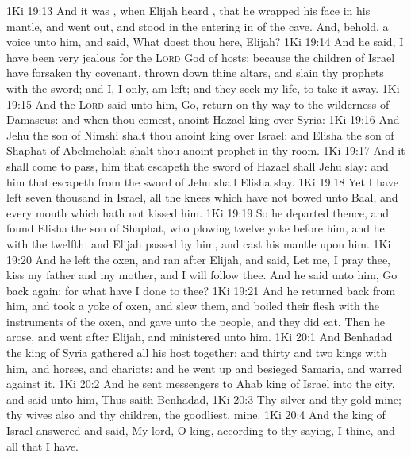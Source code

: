 \vs 1Ki 19:13 And it was , when Elijah heard , that he wrapped his face in his mantle, and went out, and stood in the entering in of the cave. And, behold,  a voice unto him, and said, What doest thou here, Elijah?
\vs 1Ki 19:14 And he said, I have been very jealous for the \textsc{Lord} God of hosts: because the children of Israel have forsaken thy covenant, thrown down thine altars, and slain thy prophets with the sword; and I,  I only, am left; and they seek my life, to take it away.
\vs 1Ki 19:15 And the \textsc{Lord} said unto him, Go, return on thy way to the wilderness of Damascus: and when thou comest, anoint Hazael  king over Syria:
\vs 1Ki 19:16 And Jehu the son of Nimshi shalt thou anoint  king over Israel: and Elisha the son of Shaphat of Abelmeholah shalt thou anoint  prophet in thy room.
\vs 1Ki 19:17 And it shall come to pass,  him that escapeth the sword of Hazael shall Jehu slay: and him that escapeth from the sword of Jehu shall Elisha slay.
\vs 1Ki 19:18 Yet I have left  seven thousand in Israel, all the knees which have not bowed unto Baal, and every mouth which hath not kissed him.
\vs 1Ki 19:19 So he departed thence, and found Elisha the son of Shaphat, who  plowing  twelve yoke  before him, and he with the twelfth: and Elijah passed by him, and cast his mantle upon him.
\vs 1Ki 19:20 And he left the oxen, and ran after Elijah, and said, Let me, I pray thee, kiss my father and my mother, and  I will follow thee. And he said unto him, Go back again: for what have I done to thee?
\vs 1Ki 19:21 And he returned back from him, and took a yoke of oxen, and slew them, and boiled their flesh with the instruments of the oxen, and gave unto the people, and they did eat. Then he arose, and went after Elijah, and ministered unto him.
\vs 1Ki 20:1 And Benhadad the king of Syria gathered all his host together: and  thirty and two kings with him, and horses, and chariots: and he went up and besieged Samaria, and warred against it.
\vs 1Ki 20:2 And he sent messengers to Ahab king of Israel into the city, and said unto him, Thus saith Benhadad,
\vs 1Ki 20:3 Thy silver and thy gold  mine; thy wives also and thy children,  the goodliest,  mine.
\vs 1Ki 20:4 And the king of Israel answered and said, My lord, O king, according to thy saying, I  thine, and all that I have.
